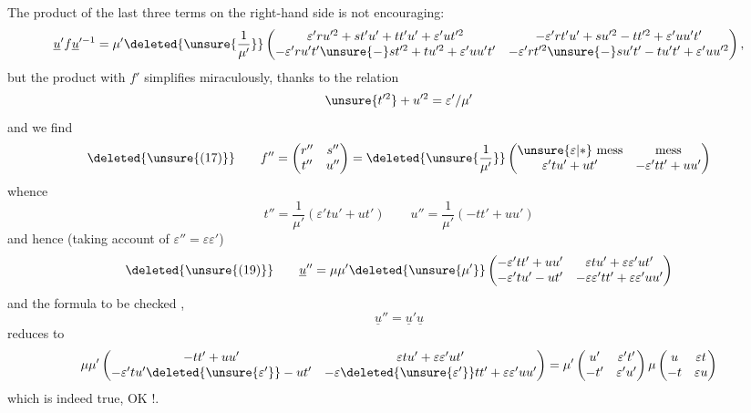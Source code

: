 
The product of the last three terms on the right-hand side is not encouraging:
\[
\underline{u}'f\underline{u}'^{-1}
=\mu'\deleted{\unsure{\frac{1}{\mu'}}}
\begin{pmatrix}
\varepsilon'ru'^2+st'u'+tt'u'+\varepsilon'ut'^2
&-\varepsilon'rt'u'+su'^2-tt'^2+\varepsilon'uu't'\\
-\varepsilon'ru't'\unsure{-}st'^2+tu'^2+\varepsilon'uu't'
&-\varepsilon'rt'^2\unsure{-}su't'-tu't'+\varepsilon'uu'^2
\end{pmatrix},
\]
but the product with $f'$ simplifies miraculously, thanks to the relation
\[
\unsure{t'^2}+u'^2=\varepsilon'/\mu'
\]
and we find
\[
\deleted{\unsure{(17)}}\qquad
f''=\begin{pmatrix}r''&s''\\t''&u''\end{pmatrix}
=\deleted{\unsure{\frac{1}{\mu'}}}
\begin{pmatrix}
\unsure{\varepsilon|*}\ \text{mess}&\text{mess}\\
\varepsilon'tu'+ut'&-\varepsilon'tt'+uu'
\end{pmatrix}
\]
whence
\[
\tag{18}
t''=\frac{1}{\mu'}(\varepsilon'tu'+ut')
\qquad
u''=\frac{1}{\mu'}(-tt'+uu')
\]
and hence (taking account of  $\varepsilon''=\varepsilon\varepsilon'$)
\[
\deleted{\unsure{(19)}}\qquad
\underline{u}''=\mu\mu'\deleted{\unsure{\mu'}}
\begin{pmatrix}
-\varepsilon'tt'+uu'&\varepsilon tu'+\varepsilon\varepsilon'ut'\\
-\varepsilon'tu'-ut'&-\varepsilon\varepsilon'tt'+\varepsilon\varepsilon'uu'
\end{pmatrix}
\]
and the formula to be checked ,
\[
\underline{u}''=\underline{u}'\underline{u}
\]
reduces to
\[
\mu\mu'\begin{pmatrix}
-tt'+uu'&\varepsilon tu'+\varepsilon\varepsilon'ut'\\
-\varepsilon'tu'\deleted{\unsure{\varepsilon'}}-ut'&-\varepsilon\deleted{\unsure{\varepsilon'}}tt'+\varepsilon\varepsilon'uu'
\end{pmatrix}
=\mu'\begin{pmatrix}u'&\varepsilon't'\\-t'&\varepsilon'u'\end{pmatrix}
\mu\begin{pmatrix}u&\varepsilon t\\-t&\varepsilon u\end{pmatrix}
\]
which is indeed true, OK !.

